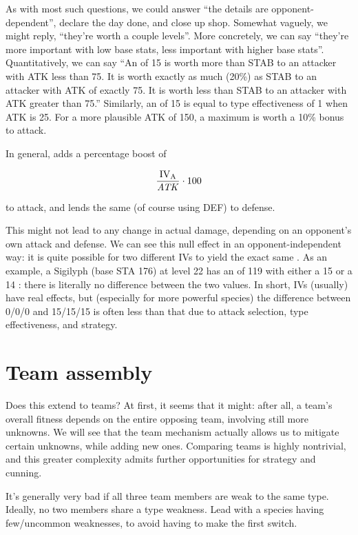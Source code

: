 As with most such questions, we could answer ``the details are opponent-dependent'',
  declare the day done, and close up shop.
Somewhat vaguely, we might reply, ``they're worth a couple levels''.
More concretely, we can say ``they're more important with low base stats, less important
  with higher base stats''.
Quantitatively, we can say ``An  of 15 is worth more than STAB to an
  attacker with ATK less than 75. It is worth exactly as much (20\%) as STAB
  to an attacker with ATK of exactly 75. It is worth less than STAB
  to an attacker with ATK greater than 75.''
Similarly, an  of 15 is equal to type effectiveness of 1 when ATK is 25.
For a more plausible ATK of 150, a maximum  is worth a 10\% bonus to attack.

In general,  adds a percentage boost of

\[ \frac{\mbox{$\mathrm{IV_{A}}$}}{\mathit{ATK}} \cdot 100 \]

\noindent{}to attack, and  lends the same (of course using DEF) to defense.

This might not lead to any change in actual damage, depending on
  an opponent's own attack and defense.
We can see this null effect in an opponent-independent way: it is quite possible
  for two different IVs to yield the exact same \MHP\@.
As an example, a Sigilyph (base STA 176) at level 22 has an \MHP{} of 119 with
  either a 15 or a 14 : there is literally no difference between the
  two values.
In short, IVs (usually) have real effects, but (especially for more powerful species)
  the difference between 0/0/0 and 15/15/15 is often less than that due to
  attack selection, type effectiveness, and strategy.

\section{Team assembly}
Does this extend to teams?
At first, it seems that it might: after all, a team's overall fitness
 depends on the entire opposing team, involving still more unknowns.
We will see that the team mechanism actually allows us to mitigate certain
 unknowns, while adding new ones.
Comparing teams is highly nontrivial, and this greater complexity admits
 further opportunities for strategy and cunning.

It's generally very bad if all three team members are weak to the same type.
Ideally, no two members share a type weakness.
Lead with a species having few/uncommon weaknesses, to avoid having to make the first switch.

